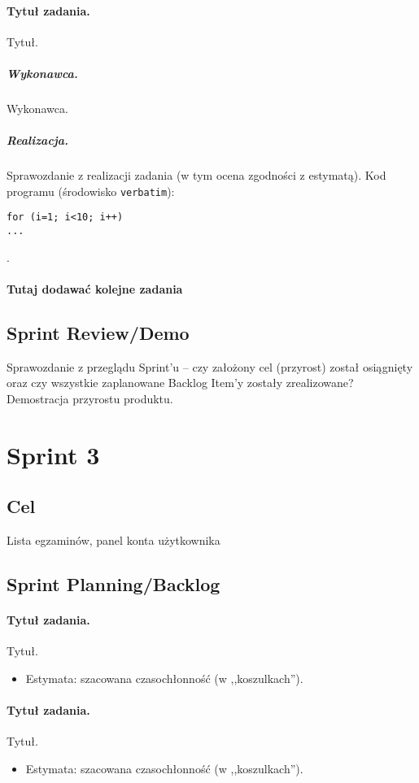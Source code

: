 \documentclass[a4paper]{article}
\begin{document}
\paragraph{Tytuł zadania.} Tytuł.
\subparagraph{Wykonawca.} Wykonawca.
\subparagraph{Realizacja.} Sprawozdanie z realizacji zadania (w tym ocena zgodności z estymatą). Kod programu (środowisko \texttt{verbatim}): \begin{verbatim}
for (i=1; i<10; i++)
...
\end{verbatim}.

\paragraph{Tutaj dodawać kolejne zadania}


\subsection{Sprint Review/Demo}
Sprawozdanie z przeglądu Sprint'u -- czy założony cel (przyrost) został osiągnięty oraz czy wszystkie zaplanowane Backlog Item'y zostały zrealizowane? Demostracja przyrostu produktu.

\section{Sprint 3}

\subsection{Cel}  Lista egzaminów, panel konta użytkownika

\subsection{Sprint Planning/Backlog}

\paragraph{Tytuł zadania.} Tytuł.
\begin{itemize}
\item Estymata: szacowana czasochłonność (w ,,koszulkach'').
\end{itemize}

\paragraph{Tytuł zadania.} Tytuł.
\begin{itemize}
\item Estymata: szacowana czasochłonność (w ,,koszulkach'').
\end{itemize}
\end{document}
